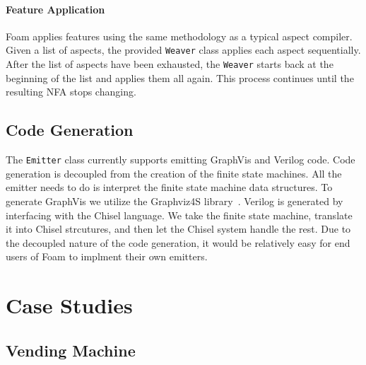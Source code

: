 \documentclass[sigplan,anonymous,review]{acmart}
\begin{document}
\paragraph{Feature Application} Foam applies features using the same methodology as a typical aspect compiler. Given a list of aspects, the provided \texttt{Weaver} class applies each aspect sequentially. After the list of aspects have been exhausted, the \texttt{Weaver} starts back at the beginning of the list and applies them all again. This process continues until the resulting NFA stops changing. 

\subsection{Code Generation}
The \texttt{Emitter} class currently supports emitting GraphVis and Verilog code. Code generation is decoupled from the creation of the finite state machines. All the emitter needs to do is interpret the finite state machine data structures. To generate GraphVis we utilize the Graphviz4S library~\cite{}. Verilog is generated by interfacing with the Chisel language. We take the finite state machine, translate it into Chisel strcutures, and then let the Chisel system handle the rest. Due to the decoupled nature of the code generation, it would be relatively easy for end users of Foam to implment their own emitters.

\section{Case Studies}

\subsection{Vending Machine}
\end{document}
